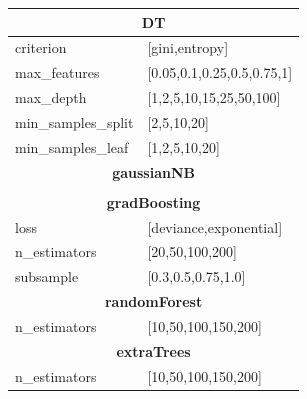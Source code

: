 {\begin{longtable}{l l}
\midrule
\multicolumn{2}{c}{\textbf{DT }} \\
\midrule

criterion & [gini,entropy] \\
max\_features & [0.05,0.1,0.25,0.5,0.75,1] \\
max\_depth & [1,2,5,10,15,25,50,100] \\
min\_samples\_split & [2,5,10,20] \\
min\_samples\_leaf & [1,2,5,10,20] \\
 
\midrule
\multicolumn{2}{c}{\textbf{gaussianNB  }} \\* 
\midrule\nopagebreak
\multicolumn{2}{c}{\textit{-}} \\

\midrule
\multicolumn{2}{c}{\textbf{gradBoosting }} \\
\midrule

loss & [deviance,exponential] \\
n\_estimators & [20,50,100,200] \\
subsample & [0.3,0.5,0.75,1.0] \\

 
\midrule
\multicolumn{2}{c}{\textbf{randomForest }} \\
\midrule

n\_estimators & [10,50,100,150,200] \\

 
\midrule
\multicolumn{2}{c}{\textbf{extraTrees }} \\
\midrule

n\_estimators & [10,50,100,150,200] \\
  

\bottomrule

\end{longtable}
}

